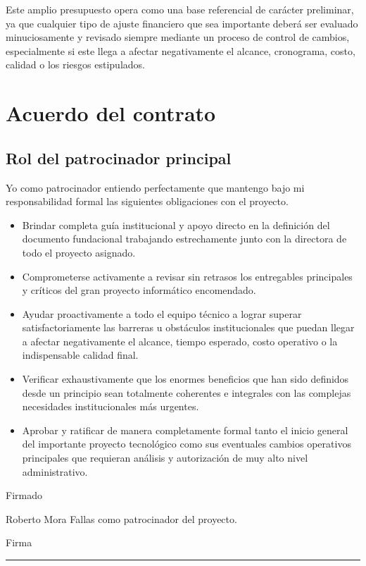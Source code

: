 \documentclass[11pt,spanish]{article}
\begin{document}
Este amplio presupuesto opera como una base referencial de carácter preliminar, ya que cualquier tipo de ajuste financiero que sea importante deberá ser evaluado minuciosamente y revisado siempre mediante un proceso de control de cambios, especialmente si este llega a afectar negativamente el alcance, cronograma, costo, calidad o los riesgos estipulados.

\section{Acuerdo del contrato}

\subsection{Rol del patrocinador principal}

Yo como patrocinador entiendo perfectamente que mantengo bajo mi responsabilidad formal las siguientes obligaciones con el proyecto.

\begin{itemize}
    \item Brindar completa guía institucional y apoyo directo en la definición del documento fundacional trabajando estrechamente junto con la directora de todo el proyecto asignado.
    \item Comprometerse activamente a revisar sin retrasos los entregables principales y críticos del gran proyecto informático encomendado.
    \item Ayudar proactivamente a todo el equipo técnico a lograr superar satisfactoriamente las barreras u obstáculos institucionales que puedan llegar a afectar negativamente el alcance, tiempo esperado, costo operativo o la indispensable calidad final.
    \item Verificar exhaustivamente que los enormes beneficios que han sido definidos desde un principio sean totalmente coherentes e integrales con las complejas necesidades institucionales más urgentes.
    \item Aprobar y ratificar de manera completamente formal tanto el inicio general del importante proyecto tecnológico como sus eventuales cambios operativos principales que requieran análisis y autorización de muy alto nivel administrativo.
\end{itemize}

Firmado

Roberto Mora Fallas como patrocinador del proyecto.

Firma \rule{7cm}{0.4pt}
\end{document}
